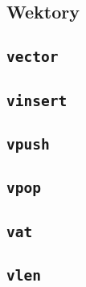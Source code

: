 \subsection{Wektory}
\label{viua_vm_ops_vector}

\subsection{\texttt{vector}}
\subsection{\texttt{vinsert}}
\subsection{\texttt{vpush}}
\subsection{\texttt{vpop}}
\subsection{\texttt{vat}}
\subsection{\texttt{vlen}}
